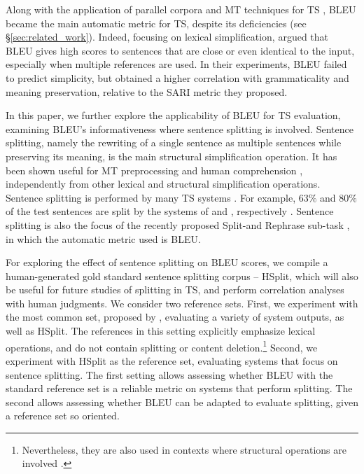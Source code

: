 \documentclass[11pt,a4paper]{article}
\begin{document}
Along with the application of parallel corpora and MT techniques for TS \citep[e.g.,][]{Z10,W12,NG14},
BLEU became the main automatic metric for TS,
despite its deficiencies (see \S\ref{sec:related_work}).
Indeed, focusing on lexical simplification, \citet{Xu16} argued that BLEU
gives high scores to sentences that are close or even identical to the input,
especially when multiple references are used.
In their experiments, BLEU failed to predict simplicity,
but obtained a higher correlation with grammaticality and meaning preservation,
relative to the SARI metric they proposed.


In this paper, we further explore the applicability of BLEU for TS evaluation, examining BLEU's
informativeness where sentence splitting is involved.
Sentence splitting, namely the rewriting of a single sentence as multiple sentences while preserving its meaning, is the main structural simplification operation. It has been shown useful for MT preprocessing \citep{C96,M14,LN15} and human comprehension \citep{MK79,W03}, independently from other lexical and structural simplification operations.
Sentence splitting is performed by many TS systems \citep{Z10,WL11,SA14,NG14,NG16}.
For example, 63$\%$ and 80$\%$ of the test sentences are split by the systems of \citet{WL11} and \citet{Z10}, respectively \citep{NG16}.
Sentence splitting is also the focus of the recently proposed Split-and Rephrase sub-task \citep{N17,AG18}, in which the automatic metric used is BLEU.

For exploring the effect of sentence splitting on BLEU scores, we compile a human-generated
gold standard sentence splitting corpus -- HSplit,
which will also be useful for future studies of splitting in TS,
and perform correlation analyses with human judgments.
We consider two reference sets. First, we experiment with the most common set, proposed by \citet{Xu16}, evaluating
a variety of system outputs, as well as HSplit.
The references in this setting explicitly emphasize lexical operations, 
and do not contain splitting or content deletion.\footnote{Nevertheless, they are also used in contexts where structural operations are involved \citep{Ni17,S18acl}.}
Second, we experiment with HSplit as the reference set, evaluating systems that focus on sentence splitting.
The first setting allows assessing whether BLEU with the standard reference set is a reliable metric on systems that perform splitting.
The second allows assessing whether BLEU can be adapted to evaluate splitting, given a reference set so oriented.
\end{document}
